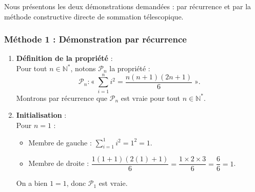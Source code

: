 \documentclass[11pt,a4paper]{article}
\newcommand{\N}{\mathbb{N}}
\begin{document}
\begin{correctionbox}
Nous présentons les deux démonstrations demandées : par récurrence et par la méthode constructive directe de sommation télescopique.

\subsubsection*{Méthode 1 : Démonstration par récurrence}

\begin{enumerate}[label=\textbf{\arabic*.}]
    \item \textbf{Définition de la propriété} :\\
    Pour tout $n \in \N^*$, notons $\mathcal{P}_n$ la propriété :
    \[
    \mathcal{P}_n : « \; \sum_{i=1}^n i^2 = \frac{n(n+1)(2n+1)}{6} \; ».
    \]
    Montrons par récurrence que $\mathcal{P}_n$ est vraie pour tout $n \in \N^*$.

    \item \textbf{Initialisation} :\\
    Pour $n = 1$ :
    \begin{itemize}
        \item Membre de gauche : $\sum_{i=1}^1 i^2 = 1^2 = 1$.
        \item Membre de droite : $\dfrac{1(1+1)(2(1)+1)}{6} = \dfrac{1 \times 2 \times 3}{6} = \dfrac{6}{6} = 1$.
    \end{itemize}
    On a bien $1 = 1$, donc $\mathcal{P}_1$ est vraie.


\end{enumerate}
\end{correctionbox}
\end{document}

